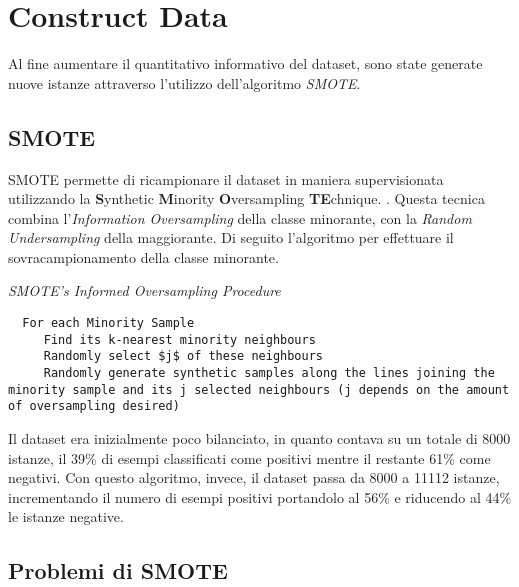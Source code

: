\section{Construct Data}
Al fine aumentare il quantitativo informativo del dataset, sono state generate nuove istanze attraverso l'utilizzo dell'algoritmo \textit{SMOTE}.
\subsection{SMOTE}
\label{SMOTE}
SMOTE permette di ricampionare il dataset in maniera supervisionata utilizzando la \textbf{S}ynthetic \textbf{M}inority \textbf{O}versampling \textbf{TE}chnique. 
\cite{Chawla02smote:synthetic}. Questa tecnica combina l'\emph{Information Oversampling} della classe minorante, con la \emph{Random Undersampling} della maggiorante. Di seguito l'algoritmo per effettuare il sovracampionamento della classe minorante.

\lstset{style=customAlg}
\begin{algorithm}
	\caption{\emph{SMOTE’s Informed Oversampling Procedure}}
	\begin{lstlisting}
  For each Minority Sample
     Find its k-nearest minority neighbours
     Randomly select $j$ of these neighbours
     Randomly generate synthetic samples along the lines joining the minority sample and its j selected neighbours (j depends on the amount of oversampling desired) 
	\end{lstlisting}
\end{algorithm}

Il dataset era inizialmente poco bilanciato, in quanto contava su un totale di 8000 istanze, il 39\% di esempi classificati come positivi mentre il restante 61\% come negativi. Con questo algoritmo, invece, il dataset passa da 8000 a 11112 istanze, incrementando il numero di esempi positivi portandolo al 56\% e riducendo al 44\% le istanze negative.
\subsection{Problemi di SMOTE}

